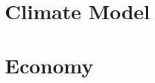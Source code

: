 \documentclass[american, abstract=on]{scrartcl}
\begin{document}


\section{Climate Model}



\section{Economy}



\nocite{*}
\newpage
\printbibliography

\appendix

\end{document}
